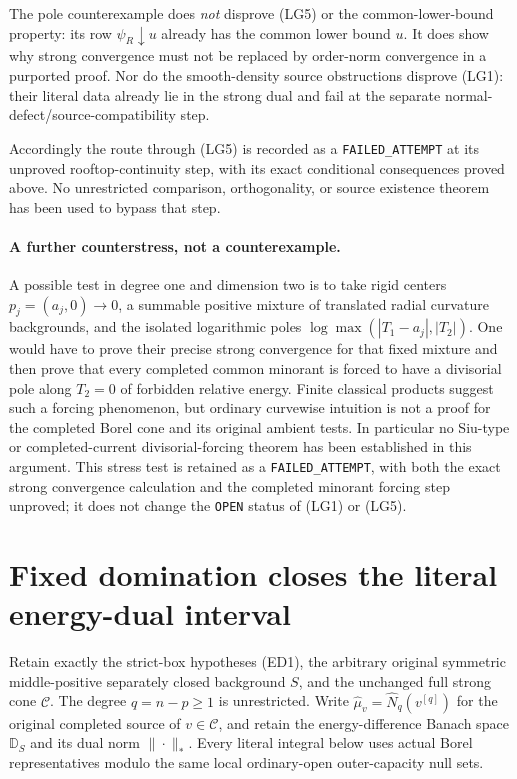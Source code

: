 \documentclass[11pt,a4paper]{article}
\numberwithin{equation}{section}
\theoremstyle{definition}
\theoremstyle{remark}
\begin{document}
The pole counterexample does \emph{not} disprove
\textup{(LG5)} or the common-lower-bound property:
its row $\psi_R\downarrow u$ already has the
common lower bound $u$.  It does show why strong
convergence must not be replaced by order-norm
convergence in a purported proof.  Nor do the
smooth-density source obstructions disprove
\textup{(LG1)}: their literal data already lie
in the strong dual and fail at the separate
normal-defect/source-compatibility step.

Accordingly the route through \textup{(LG5)} is
recorded as a \texttt{FAILED\_ATTEMPT} at its
unproved rooftop-continuity step, with its exact
conditional consequences proved above.  No
unrestricted comparison, orthogonality, or source
existence theorem has been used to bypass that step.

\paragraph{A further counterstress, not a counterexample.}
A possible test in degree one and dimension two is to
take rigid centers $p_j=(a_j,0)\to0$, a summable
positive mixture of translated radial curvature
backgrounds, and the isolated logarithmic poles
$\log\max(|T_1-a_j|,|T_2|)$.  One would have to
prove their precise strong convergence for that fixed
mixture and then prove that every completed common
minorant is forced to have a divisorial pole along
$T_2=0$ of forbidden relative energy.  Finite classical
products suggest such a forcing phenomenon, but
ordinary curvewise intuition is not a proof for the
completed Borel cone and its original ambient tests.
In particular no Siu-type or completed-current
divisorial-forcing theorem has been established in
this argument.  This stress test is retained as a
\texttt{FAILED\_ATTEMPT}, with both the exact strong
convergence calculation and the completed minorant
forcing step unproved; it does not change the
\texttt{OPEN} status of \textup{(LG1)} or \textup{(LG5)}.



\section{Fixed domination closes the literal energy-dual interval}
\label{sec:r12-fixed-domination-literal-closure}

Retain exactly the strict-box hypotheses \textup{(ED1)}, the
arbitrary original symmetric middle-positive separately closed
background $S$, and the unchanged full strong cone $\mathscr C$.
The degree $q=n-p\geq1$ is unrestricted. Write
$\widehat\mu_v=\widehat N_q(v^{[q]})$ for the original completed
source of $v\in\mathscr C$, and retain the energy-difference
Banach space $\mathbb D_S$ and its dual norm $\|\cdot\|_*$.
Every literal integral below uses actual Borel representatives
modulo the same local ordinary-open outer-capacity null sets.
\end{document}
